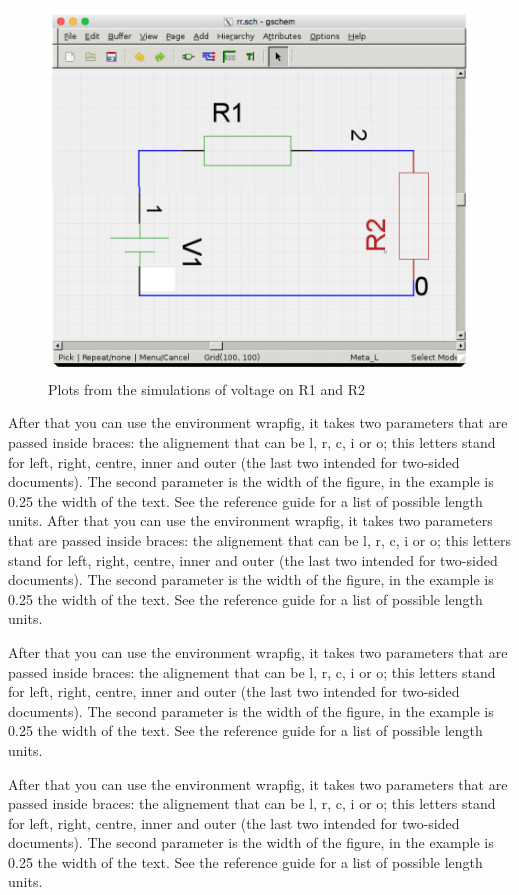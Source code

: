 \documentclass{report}
\begin{document}
		\begin{figure}[ht]
			\centering
			\includegraphics[width=0.6\linewidth]{Figures/one} 
			\caption{Plots from the simulations of voltage on R1 and R2}
			\label{fig:figure5}
		\end{figure}
		
		
		
		
		After that you can use the environment wrapfig, it takes two parameters that are passed inside braces: the alignement that can be l, r, c, i or o; this letters stand for left, right, centre, inner and outer (the last two intended for two-sided documents). The second parameter is the width of the figure, in the example is 0.25 the width of the text. See the reference guide for a list of possible length units.
		After that you can use the environment wrapfig, it takes two parameters that are passed inside braces: the alignement that can be l, r, c, i or o; this letters stand for left, right, centre, inner and outer (the last two intended for two-sided documents). The second parameter is the width of the figure, in the example is 0.25 the width of the text. See the reference guide for a list of possible length units.\cite{firstRef,thirdRef}
		
		After that you can use the environment wrapfig, it takes two parameters that are passed inside braces: the alignement that can be l, r, c, i or o; this letters stand for left, right, centre, inner and outer (the last two intended for two-sided documents). The second parameter is the width of the figure, in the example is 0.25 the width of the text. See the reference guide for a list of possible length units.\cite{firstRef,thirdRef}
		
		After that you can use the environment wrapfig, it takes two parameters that are passed inside braces: the alignement that can be l, r, c, i or o; this letters stand for left, right, centre, inner and outer (the last two intended for two-sided documents). The second parameter is the width of the figure, in the example is 0.25 the width of the text. See the reference guide for a list of possible length units.\cite{firstRef,thirdRef}
		
\end{document}
